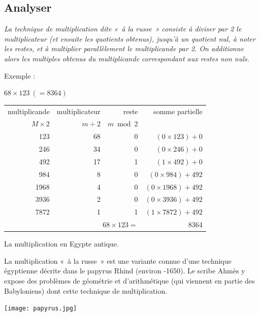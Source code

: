 \subsection{Analyser}\label{sub:analyser}
\begin{td}\label{td:russe}
\em
La technique de multiplication dite «~à la rus\-se~» consiste à diviser par 
2 le multiplicateur (et ensuite les quotients obtenus), 
jusqu'à un quotient nul, à noter les restes,
et à multiplier parallèlement le multiplicande par 2. 
On additionne alors les multiples obtenus du multiplicande 
correspondant aux restes non nuls.

\noindent\begin{minipage}[t]{14cm}
\noindent Exemple : \begin{minipage}[t]{10cm}
$68 \times 123\ (= 8364)$\\
\begin{tabular}{|r|r|r|r|}
\hline
multiplicande & multiplicateur & reste      & somme partielle\\
$M \times 2$  & $m \div 2$     & $m \bmod 2$ &       \\
\hline
123  & 68 &   0   &   $(0\times 123) + 0$ \\
246  & 34 &   0   &   $(0\times 246) + 0$ \\
492  & 17 &   1   &   $(1\times 492) + 0$ \\
984  &  8 &   0   &   $(0\times 984) + 492$  \\
1968 &  4 &   0   &   $(0\times 1968) + 492$ \\
3936 &  2 &   0   &   $(0\times 3936) + 492$ \\
7872 &  1 &   1   &   $(1\times 7872) + 492$ \\
\hline
\multicolumn{3}{|r|}{$68 \times 123 =$} & 8364\\
\hline
\end{tabular}
\end{minipage}
\end{minipage}
\hfill
\begin{minipage}[t]{8cm}\footnotesize
\begin{rem}La multiplication en Egypte antique.\\[1mm]
\begin{minipage}{4cm}
La multiplication «~à la rus\-se~»
est une variante connue d'une technique égyptienne
décrite dans le papyrus Rhind (environ -1650). Le scribe Ahmès
y expose des problèmes de géométrie et d'arithmétique (qui viennent en partie 
des Babyloniens) dont cette technique de multiplication.
\end{minipage}
\hfill
\begin{minipage}{3.6cm}
\texttt{[image: papyrus.jpg]}
\end{minipage}
\end{rem}
\end{minipage}
\vspace*{3mm}


\end{td}
